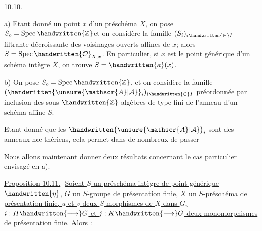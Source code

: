 \uline{10.10.} 

a) Etant donné un point $x$ d'un préschéma $X$, on pose $S_o=\operatorname{Spec}\handwritten{\mathbb{Z}}$\handwritten{/}et on considère la famille $(S_i)_{i\handwritten{\in}I}$ filtrante décroissante des voisinages  ouverts affines de $x$; alors $S=\operatorname{Spec}\handwritten{\mathcal{O}}_{X,x}$. En particulier, si $x$ est le point générique d'un schéma intègre $X$, on trouve $S=\handwritten{\kappa}(x)$.

b) On pose $S_o=\operatorname{Spec}\handwritten{\mathbb{Z}}$, et on considère la famille $(\handwritten{\unsure{\mathscr{A}|\mathcal{A}}}_i)_{i\handwritten{\in}I}$ préordonnée par inclusion des sous-$\handwritten{\mathbb{Z}}$-algèbres de type fini de l'anneau d'un schéma affine $S$.

Etant donné que les $\handwritten{\unsure{\mathscr{A}|\mathcal{A}}}_i$ sont des anneaux  nœ thériens, cela permet dans de nombreux de passer

Nous allons maintenant donner deux résultats concernant le cas particulier envisagé en a).

\uline{Proposition 10.11.}- \uline{Soient $S$ un préschéma intègre de point générique $\handwritten{\eta}$, $G$ un $S$-groupe de présentation finie, $X$ un $S$-préschéma de présentation finie, $u$ et $v$ deux $S$-morphismes de $X$ dans $G$, $i:H\handwritten{\longrightarrow}G$ et $j:K\handwritten{\longrightarrow}G$ deux monomorphismes de présentation finie. Alors :}

